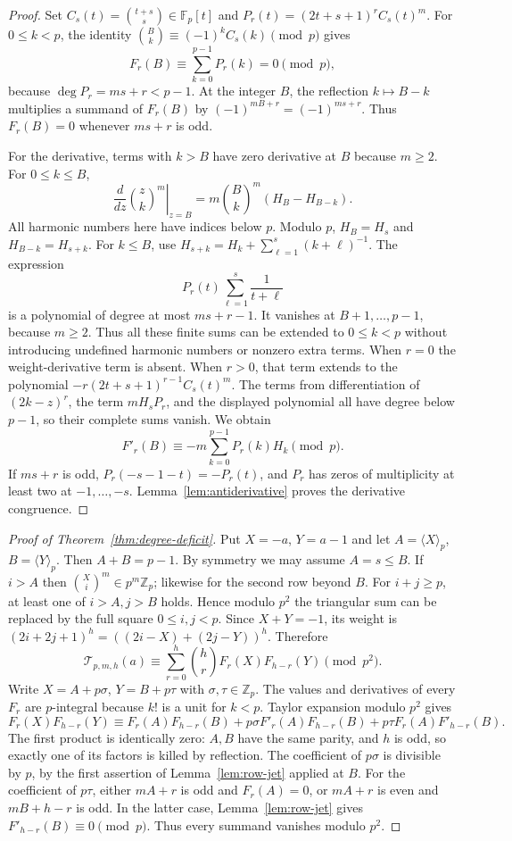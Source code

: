 \documentclass[11pt,a4paper]{article}
\theoremstyle{remark}
\begin{document}
\begin{proof}
Set $C_s(t)=\binom{t+s}{s}\in\mathbb F_p[t]$ and
$P_r(t)=(2t+s+1)^rC_s(t)^m$.
For $0\le k<p$, the identity
$\binom Bk\equiv(-1)^k C_s(k)\pmod p$ gives
\[
 F_r(B)\equiv\sum_{k=0}^{p-1}P_r(k)=0\pmod p,
\]
because $\deg P_r=ms+r<p-1$.
At the integer $B$, the reflection $k\mapsto B-k$ multiplies a
summand of $F_r(B)$ by $(-1)^{mB+r}=(-1)^{ms+r}$.
Thus $F_r(B)=0$ whenever $ms+r$ is odd.

For the derivative, terms with $k>B$ have zero derivative at $B$
because $m\ge2$. For $0\le k\le B$,
\[
 \left.\frac d{dz}\binom zk^m\right|_{z=B}
   =m\binom Bk^m(H_B-H_{B-k}).
\]
All harmonic numbers here have indices below $p$.
Modulo $p$, $H_B=H_s$ and $H_{B-k}=H_{s+k}$.
For $k\le B$, use
$H_{s+k}=H_k+\sum_{\ell=1}^s(k+\ell)^{-1}$.
The expression
\[
 P_r(t)\sum_{\ell=1}^s\frac1{t+\ell}
\]
is a polynomial of degree at most $ms+r-1$.
It vanishes at $B+1,\ldots,p-1$, because $m\ge2$.
Thus all these finite sums can be extended to $0\le k<p$ without
introducing undefined harmonic numbers or nonzero extra terms.
When $r=0$ the weight-derivative term is absent. When $r>0$,
that term extends to the polynomial $-r(2t+s+1)^{r-1}C_s(t)^m$.
The terms from differentiation of $(2k-z)^r$, the term $mH_sP_r$,
and the displayed polynomial all have degree below $p-1$, so their
complete sums vanish. We obtain
\[
                  F'_r(B)\equiv-m\sum_{k=0}^{p-1}P_r(k)H_k\pmod p.
\]
If $ms+r$ is odd, $P_r(-s-1-t)=-P_r(t)$, and $P_r$ has zeros of
multiplicity at least two at $-1,\ldots,-s$.
Lemma~\ref{lem:antiderivative} proves the derivative congruence.
\end{proof}

\begin{proof}[Proof of Theorem~\ref{thm:degree-deficit}]
Put $X=-a$, $Y=a-1$ and let $A=\langle X\rangle_p$,
$B=\langle Y\rangle_p$. Then $A+B=p-1$.
By symmetry we may assume $A=s\le B$.
If $i>A$ then $\binom Xi^m\in p^m\mathbb Z_p$; likewise for the
second row beyond $B$. For $i+j\ge p$, at least one of $i>A,j>B$
holds. Hence modulo $p^2$ the triangular sum can be replaced by
the full square $0\le i,j<p$.
Since $X+Y=-1$, its weight is
$(2i+2j+1)^h=((2i-X)+(2j-Y))^h$. Therefore
\[
 \mathcal T_{p,m,h}(a)
 \equiv\sum_{r=0}^h\binom hr F_r(X)F_{h-r}(Y)\pmod{p^2}.
\]
Write $X=A+p\sigma$, $Y=B+p\tau$ with $\sigma,\tau\in\mathbb Z_p$.
The values and derivatives of every $F_r$ are $p$-integral because
$k!$ is a unit for $k<p$. Taylor expansion modulo $p^2$ gives
\[
 F_r(X)F_{h-r}(Y)\equiv
 F_r(A)F_{h-r}(B)
 +p\sigma F'_r(A)F_{h-r}(B)
 +p\tau F_r(A)F'_{h-r}(B).
\]
The first product is identically zero: $A,B$ have the same parity,
and $h$ is odd, so exactly one of its factors is killed by reflection.
The coefficient of $p\sigma$ is divisible by $p$, by the first assertion of
Lemma~\ref{lem:row-jet} applied at $B$.
For the coefficient of $p\tau$, either $mA+r$ is odd and $F_r(A)=0$, or
$mA+r$ is even and $mB+h-r$ is odd. In the latter case,
Lemma~\ref{lem:row-jet} gives $F'_{h-r}(B)\equiv0\pmod p$.
Thus every summand vanishes modulo $p^2$.
\end{proof}
\end{document}
